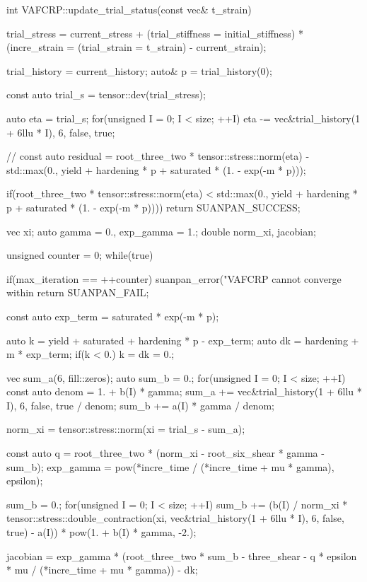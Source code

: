 \begin{cppcode}
int VAFCRP::update_trial_status(const vec& t_strain) {
    trial_stress = current_stress + (trial_stiffness = initial_stiffness) * (incre_strain = (trial_strain = t_strain) - current_strain);

    trial_history = current_history;
    auto& p = trial_history(0);

    const auto trial_s = tensor::dev(trial_stress);

    auto eta = trial_s;
    for(unsigned I = 0; I < size; ++I) eta -= vec{&trial_history(1 + 6llu * I), 6, false, true};

    // const auto residual = root_three_two * tensor::stress::norm(eta) - std::max(0., yield + hardening * p + saturated * (1. - exp(-m * p)));

    if(root_three_two * tensor::stress::norm(eta) < std::max(0., yield + hardening * p + saturated * (1. - exp(-m * p)))) return SUANPAN_SUCCESS;

    vec xi;
    auto gamma = 0., exp_gamma = 1.;
    double norm_xi, jacobian;

    unsigned counter = 0;
    while(true) {
        if(max_iteration == ++counter) {
            suanpan_error("VAFCRP cannot converge within %
            return SUANPAN_FAIL;
        }

        const auto exp_term = saturated * exp(-m * p);

        auto k = yield + saturated + hardening * p - exp_term;
        auto dk = hardening + m * exp_term;
        if(k < 0.) k = dk = 0.;

        vec sum_a(6, fill::zeros);
        auto sum_b = 0.;
        for(unsigned I = 0; I < size; ++I) {
            const auto denom = 1. + b(I) * gamma;
            sum_a += vec{&trial_history(1 + 6llu * I), 6, false, true} / denom;
            sum_b += a(I) * gamma / denom;
        }

        norm_xi = tensor::stress::norm(xi = trial_s - sum_a);

        const auto q = root_three_two * (norm_xi - root_six_shear * gamma - sum_b);
        exp_gamma = pow(*incre_time / (*incre_time + mu * gamma), epsilon);

        sum_b = 0.;
        for(unsigned I = 0; I < size; ++I) sum_b += (b(I) / norm_xi * tensor::stress::double_contraction(xi, vec{&trial_history(1 + 6llu * I), 6, false, true}) - a(I)) * pow(1. + b(I) * gamma, -2.);

        jacobian = exp_gamma * (root_three_two * sum_b - three_shear - q * epsilon * mu / (*incre_time + mu * gamma)) - dk;

}}
\end{cppcode}
